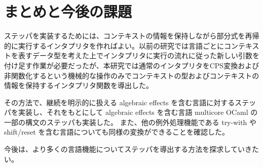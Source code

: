 \section{まとめと今後の課題}
\label{section:conclusion}

ステッパを実装するためには、コンテキストの情報を保持しながら部分式を再帰的に実行するインタプリタを作ればよい。以前の研究\cite{FCA19}では言語ごとにコンテキストを表すデータ型を考えた上でインタプリタに実行の流れに従った新しい引数を付け足す作業が必要だったが、本研究では通常のインタプリタをCPS変換および非関数化するという機械的な操作のみでコンテキストの型およびコンテキストの情報を保持するインタプリタ関数を導出した。

その方法で、継続を明示的に扱える algebraic effects を含む言語に対するステッパを実装し、それをもとにして algebraic effects を含む言語 multicore OCaml の一部の構文のステッパも実装した。
また、他の例外処理機能である try-with や shift/reset を含む言語についても同様の変換ができることを確認した。

今後は、より多くの言語機能についてステッパを導出する方法を探求していきたい。

